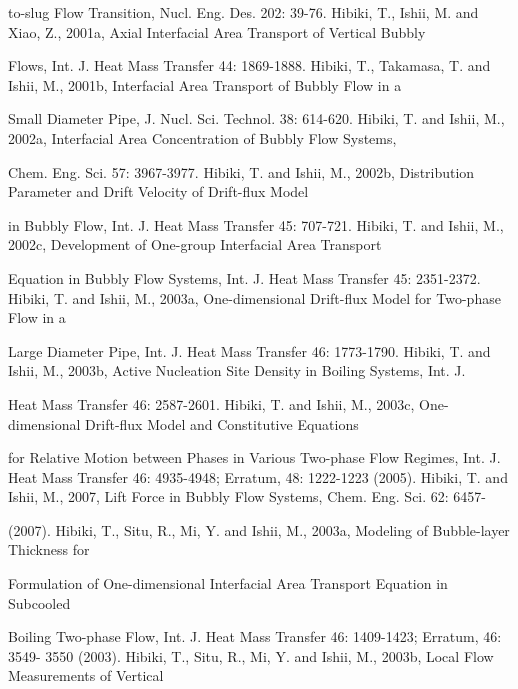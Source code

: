 \documentclass[11pt,a4paper,openany,fontset=none]{ctexbook}
\begin{document}
{\small\raggedright\noindent to-slug Flow Transition, Nucl. Eng. Des. 202: 39-76. Hibiki, T., Ishii, M. and Xiao, Z., 2001a, Axial Interfacial Area Transport of Vertical Bubbly\par}
{\small\raggedright\noindent Flows, Int. J. Heat Mass Transfer 44: 1869-1888. Hibiki, T., Takamasa, T. and Ishii, M., 2001b, Interfacial Area Transport of Bubbly Flow in a\par}
{\small\raggedright\noindent Small Diameter Pipe, J. Nucl. Sci. Technol. 38: 614-620. Hibiki, T. and Ishii, M., 2002a, Interfacial Area Concentration of Bubbly Flow Systems,\par}
{\small\raggedright\noindent Chem. Eng. Sci. 57: 3967-3977. Hibiki, T. and Ishii, M., 2002b, Distribution Parameter and Drift Velocity of Drift-flux Model\par}
{\small\raggedright\noindent in Bubbly Flow, Int. J. Heat Mass Transfer 45: 707-721. Hibiki, T. and Ishii, M., 2002c, Development of One-group Interfacial Area Transport\par}
{\small\raggedright\noindent Equation in Bubbly Flow Systems, Int. J. Heat Mass Transfer 45: 2351-2372. Hibiki, T. and Ishii, M., 2003a, One-dimensional Drift-flux Model for Two-phase Flow in a\par}
{\small\raggedright\noindent Large Diameter Pipe, Int. J. Heat Mass Transfer 46: 1773-1790. Hibiki, T. and Ishii, M., 2003b, Active Nucleation Site Density in Boiling Systems, Int. J.\par}
{\small\raggedright\noindent Heat Mass Transfer 46: 2587-2601. Hibiki, T. and Ishii, M., 2003c, One-dimensional Drift-flux Model and Constitutive Equations\par}
{\small\raggedright\noindent for Relative Motion between Phases in Various Two-phase Flow Regimes, Int. J. Heat Mass Transfer 46: 4935-4948; Erratum, 48: 1222-1223 (2005). Hibiki, T. and Ishii, M., 2007, Lift Force in Bubbly Flow Systems, Chem. Eng. Sci. 62: 6457-\par}
{\small\raggedright{} (2007). Hibiki, T., Situ, R., Mi, Y. and Ishii, M., 2003a, Modeling of Bubble-layer Thickness for\par}
{\small\raggedright\noindent Formulation of One-dimensional Interfacial Area Transport Equation in Subcooled\par}
{\small\raggedright\noindent Boiling Two-phase Flow, Int. J. Heat Mass Transfer 46: 1409-1423; Erratum, 46: 3549- 3550 (2003). Hibiki, T., Situ, R., Mi, Y. and Ishii, M., 2003b, Local Flow Measurements of Vertical\par}
\end{document}
